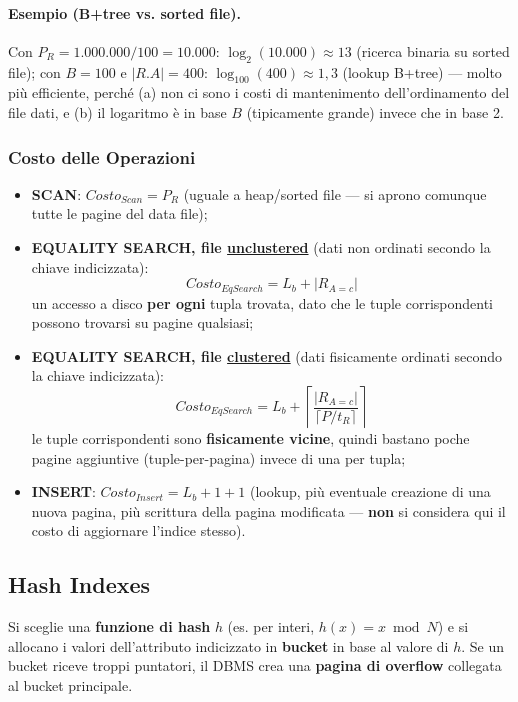 \documentclass[12pt, a4paper]{article}
\begin{document}
\paragraph{Esempio (B+tree vs. sorted file).} Con $P_R = 1.000.000/100 = 10.000$: $\log_2(10.000)\approx 13$ (ricerca binaria su sorted file); con $B=100$ e $|R.A|=400$: $\log_{100}(400)\approx 1{,}3$ (lookup B+tree) — molto più efficiente, perché (a) non ci sono i costi di mantenimento dell'ordinamento del file dati, e (b) il logaritmo è in base $B$ (tipicamente grande) invece che in base 2.

\subsubsection{Costo delle Operazioni}
\begin{itemize}
    \item \textbf{SCAN}: $Costo_{Scan} = P_R$ (uguale a heap/sorted file — si aprono comunque tutte le pagine del data file);
    \item \textbf{EQUALITY SEARCH, file \underline{unclustered}} (dati non ordinati secondo la chiave indicizzata): $$Costo_{EqSearch} = L_b + |R_{A=c}|$$ un accesso a disco \textbf{per ogni} tupla trovata, dato che le tuple corrispondenti possono trovarsi su pagine qualsiasi;
    \item \textbf{EQUALITY SEARCH, file \underline{clustered}} (dati fisicamente ordinati secondo la chiave indicizzata): $$Costo_{EqSearch} = L_b + \left\lceil \frac{|R_{A=c}|}{\lceil P/t_R\rceil} \right\rceil$$ le tuple corrispondenti sono \textbf{fisicamente vicine}, quindi bastano poche pagine aggiuntive (tuple-per-pagina) invece di una per tupla;
    \item \textbf{INSERT}: $Costo_{Insert} = L_b + 1 + 1$ (lookup, più eventuale creazione di una nuova pagina, più scrittura della pagina modificata — \textbf{non} si considera qui il costo di aggiornare l'indice stesso).
\end{itemize}

\subsection{Hash Indexes}
Si sceglie una \textbf{funzione di hash} $h$ (es. per interi, $h(x)=x \bmod N$) e si allocano i valori dell'attributo indicizzato in \textbf{bucket} in base al valore di $h$. Se un bucket riceve troppi puntatori, il DBMS crea una \textbf{pagina di overflow} collegata al bucket principale.
\end{document}
